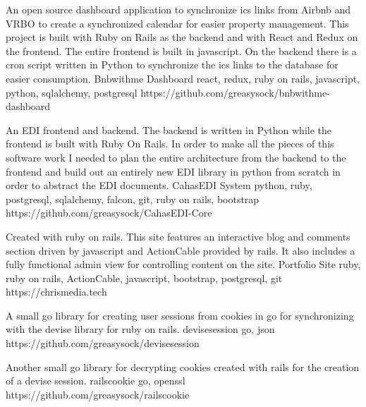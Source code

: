 \documentclass[]{awesome-cv}
\begin{document}
\vspace{-7mm}
\begin{cventries}
	\cventry
	{An open source dashboard application to synchronize ics links from Airbnb and VRBO to create a synchronized calendar for easier property management. This project is built with Ruby on Rails as the backend and with React and Redux on the frontend. The entire frontend is built in javascript. On the backend there is a cron script written in Python to synchronize the ics links to the database for easier consumption.}
	{Bnbwithme Dashboard}
	{react, redux, ruby on rails, javascript, python, sqlalchemy, postgresql}
	{https://github.com/greasysock/bnbwithme-dashboard}
	{}
	
	\vspace{-5mm}
	\cventry
	{An EDI frontend and backend. The backend is written in Python while the frontend is built with Ruby On Rails. In order to make all the pieces of this software work I needed to plan the entire architecture from the backend to the frontend and build out an entirely new EDI library in python from scratch in order to abstract the EDI documents.}
	{CahasEDI System}
	{python, ruby, postgresql, sqlalchemy, falcon, git, ruby on rails, bootstrap}
	{https://github.com/greasysock/CahasEDI-Core}
	{}
	
	\vspace{-5mm}
	\cventry
	{Created with ruby on rails. This site features an interactive blog and comments section driven by javascript and ActionCable provided by rails. It also includes a fully functional admin view for controlling content on the site.}
	{Portfolio Site}
	{ruby, ruby on rails, ActionCable, javascript, bootstrap, postgresql, git}
	{https://chrismedia.tech}
	{}
	
	\vspace{-5mm}
\end{cventries}

\vspace{3mm}
\begin{cventries}
	\cventry
	{A small go library for creating user sessions from cookies in go for synchronizing with the devise library for ruby on rails.}
	{devisesession}
	{go, json}
	{https://github.com/greasysock/devisesession}
	{}
	
	\vspace{-5mm}
	\cventry
	{Another small go library for decrypting cookies created with rails for the creation of a devise session.}
	{railscookie}
	{go, openssl}
	{https://github.com/greasysock/railscookie}
	{}
\end{cventries}

\ 
\end{document}
